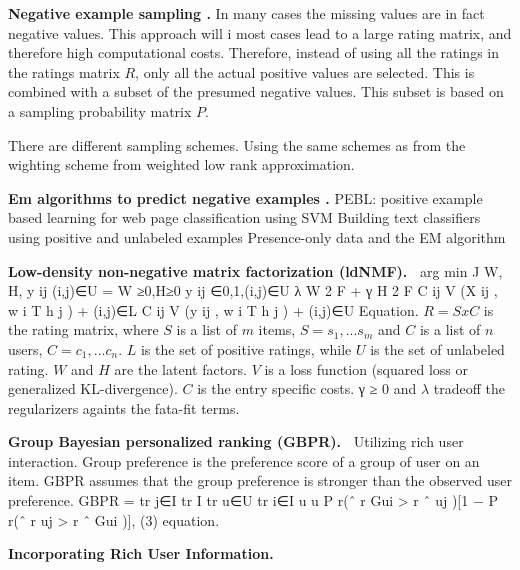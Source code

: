 \textbf{Negative example sampling .}
In many cases the missing values are in fact negative values.
This approach will i most cases lead to a large rating matrix, and therefore high computational costs.
Therefore, instead of using all the ratings in the ratings matrix $R$, only all the actual positive values are selected.
This is combined with a subset of the presumed negative values.
This subset is based on a sampling probability matrix $P$.

There are different sampling schemes.
Using the same schemes as from the wighting scheme from weighted low rank approximation.

\textbf{Em algorithms to predict negative examples .}
PEBL: positive example based learning for web page classification using SVM
Building text classifiers using positive and unlabeled examples
Presence-only data and the EM algorithm

\textbf{Low-density non-negative matrix factorization (ldNMF).~}
arg min
J W, H, {y ij } (i,j)∈U =
W ≥0,H≥0
y ij ∈{0,1},(i,j)∈U
λ W
2
F
+ γ H
2
F
C ij V (X ij , w i T h j )
+
(i,j)∈L
C ij V (y ij , w i T h j )
+
(i,j)∈U
Equation.
$R = SxC$  is the rating matrix, where $S$ is a list of $m$ items, $S = {s_{1},...s_{m}}$ and $C$ is a list of $n$ users, $C = {c_{1}, ... c_{n}}$.
$L$ is the set of positive ratings, while $U$ is the set of unlabeled rating.
$W$ and $H$ are the latent factors.
$V$ is a loss function (squared loss or generalized KL-divergence).
$C$ is the entry specific costs.
γ ≥ 0 and $λ$ tradeoff the regularizers againts the fata-fit terms.

\textbf{Group Bayesian personalized ranking (GBPR).~}
Utilizing rich user interaction.
Group preference is the preference score of a group of user on an item. 
GBPR assumes that the group preference is stronger than the observed user preference.
GBPR =
tr j∈I tr I tr
u∈U tr i∈I u
u
P r(ˆ
r Gui > r ˆ uj )[1 − P r(ˆ
r uj > r ˆ Gui )], (3)
equation.

\textbf{Incorporating Rich User Information. }


